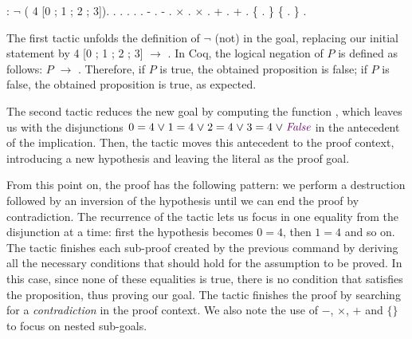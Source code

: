 \begin{coqdoccode}
	\coqdocnoindent
	  : \ensuremath{\lnot} ( 4 [0 ; 1 ; 2 ; 3]).\coqdoceol
	\coqdocnoindent
	.\coqdoceol
	\coqdocindent{1.00em}
	 . . .\coqdoceol
	\coqdocindent{1.00em}
	 .\coqdoceol
	\coqdocindent{1.00em}
	-  .\coqdoceol
	\coqdocindent{1.00em}
	-  .\coqdoceol
	\coqdocindent{2.00em}
	\ensuremath{\times}  .\coqdoceol
	\coqdocindent{2.00em}
	\ensuremath{\times}  .\coqdoceol
	\coqdocindent{3.00em}
	+  .\coqdoceol
	\coqdocindent{3.00em}
	+  .\coqdoceol
	\coqdocindent{4.00em}
	\{  . \}\coqdoceol
	\coqdocindent{4.00em}
	\{ . \}\coqdoceol
	\coqdocnoindent
	.\coqdoceol
\end{coqdoccode}

The first tactic unfolds the definition of \ensuremath{\lnot} (not) in the goal, replacing our initial statement by  4 [0 ; 1 ; 2 ; 3] \ensuremath{\rightarrow} . In Coq, the logical negation of $P$ is defined as follows: $P$ \ensuremath{\rightarrow} . Therefore, if $P$ is true, the obtained proposition is false; if $P$ is false, the obtained proposition is true, as expected.

The second tactic reduces the new goal by computing the function , which leaves us with the disjunctions $ 0 = 4 \lor 1 = 4 \lor 2 = 4 \lor 3 = 4 \lor \coqdocvar{False} $ in the antecedent of the implication. Then, the tactic  moves this antecedent to the proof context, introducing a new hypothesis  and leaving the literal  as the proof goal.

From this point on, the proof has the following pattern: we perform a destruction followed by an inversion of the hypothesis until we can end the proof by contradiction. The recurrence of the tactic  lets us focus in one equality from the disjunction at a time: first the hypothesis becomes $ 0 = 4 $, then $ 1 = 4 $ and so on. The tactic  finishes each sub-proof created by the previous command by deriving all the necessary conditions that should hold for the assumption to be proved. In this case, since none of these equalities is true, there is no condition that satisfies the proposition, thus proving our goal. The tactic  finishes the proof by searching for a \emph{contradiction} in the proof context. We also note the use of $-$, $\times$, $+$ and $\{ \}$ to focus on nested sub-goals.

